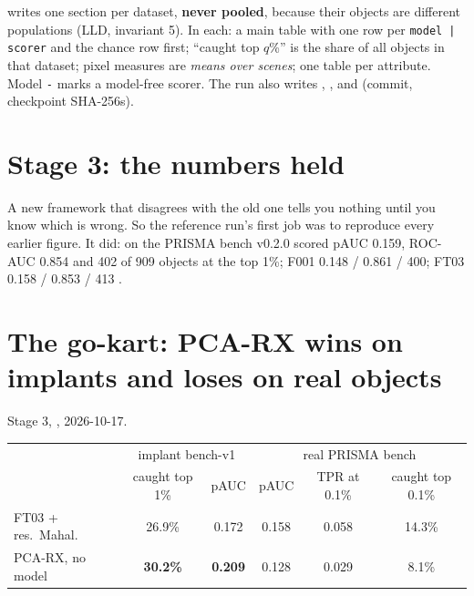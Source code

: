  writes one section per dataset, \textbf{never pooled}, because their objects are different populations
(LLD, invariant 5). In each: a main table with one row per \texttt{model | scorer} and the chance row first; ``caught top
$q$\%'' is the share of all objects in that dataset; pixel measures are \emph{means over scenes}; one table per
 attribute. Model \texttt{-} marks a model-free scorer. The run also writes ,
,  and  (commit, checkpoint SHA-256s).

\section{Stage 3: the numbers held}\label{sec:runeval:stage3}

A new framework that disagrees with the old one tells you nothing until you know which is wrong. So the reference run's
first job was to reproduce every earlier figure. It did: on the PRISMA bench v0.2.0 scored pAUC 0.159, ROC-AUC 0.854
and 402 of 909 objects at the top 1\%; F001 0.148 / 0.861 / 400; FT03 0.158 / 0.853 / 413
\hfil{}\hfilneg{}.

\section{The go-kart: PCA-RX wins on implants and loses on real objects}\label{sec:runeval:pcarx}

\begin{drift}
Stage 3, , 2026-10-17\hfil{}\hfilneg{}.
\begin{center}
\small
\begin{tabular}{lccccc}
\toprule
 & \multicolumn{2}{c}{implant bench-v1} & \multicolumn{3}{c}{real PRISMA bench} \\
 & caught top 1\% & pAUC & pAUC & TPR at 0.1\% & caught top 0.1\% \\
\midrule
FT03 + res.\ Mahal. & 26.9\% & 0.172 & 0.158 & 0.058 & 14.3\% \\
PCA-RX, no model & \textbf{30.2\%} & \textbf{0.209} & 0.128 & 0.029 & 8.1\% \\
\bottomrule
\end{tabular}
\end{center}
\end{drift}


